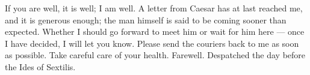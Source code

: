 

If you are well, it is well; I am well. A letter from Caesar has at last reached me, and it is generous enough; the man himself is said to be coming sooner than expected. Whether I should go forward to meet him or wait for him here --- once I have decided, I will let you know. Please send the couriers back to me as soon as possible. Take careful care of your health. Farewell. Despatched the day before the Ides of Sextilis.

